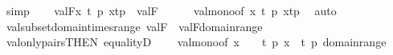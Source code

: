 \begin{isabellebody}
\ simp\isanewline
{}\isamarkupfalse%
\isanewline
\ \ \isamarkupfalse%
\ {\isachardoublequoteopen}val{\isacharparenleft}{\kern0pt}F{\isacharcomma}{\kern0pt}{\isacharbraceleft}{\kern0pt}x{\isasymin}{\isasymtau}{\isachardot}{\kern0pt}\ {\isasymexists}t\ p{\isachardot}{\kern0pt}\ x{\isacharequal}{\kern0pt}{\isasymlangle}t{\isacharcomma}{\kern0pt}p{\isasymrangle}{\isacharbraceright}{\kern0pt}{\isacharparenright}{\kern0pt}\ {\isasymsubseteq}\ val{\isacharparenleft}{\kern0pt}F{\isacharcomma}{\kern0pt}{\isasymtau}{\isacharparenright}{\kern0pt}{\isachardoublequoteclose}\isanewline
\ \ \ \ \isamarkupfalse%
\ val{\isacharunderscore}{\kern0pt}mono{\isacharbrackleft}{\kern0pt}of\ {\isachardoublequoteopen}{\isacharbraceleft}{\kern0pt}x{\isasymin}{\isasymtau}{\isachardot}{\kern0pt}\ {\isasymexists}t\ p{\isachardot}{\kern0pt}\ x{\isacharequal}{\kern0pt}{\isasymlangle}t{\isacharcomma}{\kern0pt}p{\isasymrangle}{\isacharbraceright}{\kern0pt}{\isachardoublequoteclose}{\isacharbrackright}{\kern0pt}\ \isamarkupfalse%
\ auto\isanewline
{}\isamarkupfalse%
%
\endisatagproof
{\isafoldproof}%
%
\isadelimproof
\isanewline
%
\endisadelimproof
\isanewline
{}\isamarkupfalse%
\ val{\isacharunderscore}{\kern0pt}subset{\isacharunderscore}{\kern0pt}domain{\isacharunderscore}{\kern0pt}times{\isacharunderscore}{\kern0pt}range{\isacharcolon}{\kern0pt}\ {\isachardoublequoteopen}val{\isacharparenleft}{\kern0pt}F{\isacharcomma}{\kern0pt}{\isasymtau}{\isacharparenright}{\kern0pt}\ {\isasymsubseteq}\ val{\isacharparenleft}{\kern0pt}F{\isacharcomma}{\kern0pt}domain{\isacharparenleft}{\kern0pt}{\isasymtau}{\isacharparenright}{\kern0pt}{\isasymtimes}range{\isacharparenleft}{\kern0pt}{\isasymtau}{\isacharparenright}{\kern0pt}{\isacharparenright}{\kern0pt}{\isachardoublequoteclose}\isanewline
%
\isadelimproof
\ \ %
\endisadelimproof
%
\isatagproof
{}\isamarkupfalse%
\ val{\isacharunderscore}{\kern0pt}only{\isacharunderscore}{\kern0pt}pairs{\isacharbrackleft}{\kern0pt}THEN\ equalityD{}{\isacharbrackright}{\kern0pt}\isanewline
\ \ \ \ val{\isacharunderscore}{\kern0pt}mono{\isacharbrackleft}{\kern0pt}of\ {\isachardoublequoteopen}{\isacharbraceleft}{\kern0pt}x\ {\isasymin}\ {\isasymtau}\ {\isachardot}{\kern0pt}\ {\isasymexists}t\ p{\isachardot}{\kern0pt}\ x\ {\isacharequal}{\kern0pt}\ {\isasymlangle}t{\isacharcomma}{\kern0pt}\ p{\isasymrangle}{\isacharbraceright}{\kern0pt}{\isachardoublequoteclose}\ {\isachardoublequoteopen}domain{\isacharparenleft}{\kern0pt}{\isasymtau}{\isacharparenright}{\kern0pt}{\isasymtimes}range{\isacharparenleft}{\kern0pt}{\isasymtau}{\isacharparenright}{\kern0pt}{\isachardoublequoteclose}{\isacharbrackright}{\kern0pt}\ \isamarkupfalse%

\end{isabellebody}
